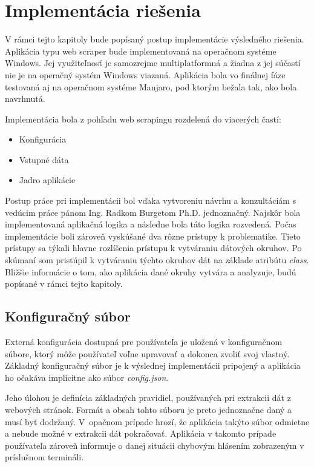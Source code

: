 \chapter{Implementácia riešenia}
\label{implementacia}

V rámci tejto kapitoly bude popísaný postup implementácie výsledného riešenia. Aplikácia typu web scraper bude implementovaná na operačnom systéme Windows. Jej využiteľnosť je samozrejme multiplatformná a žiadna z jej súčastí nie je na operačný systém Windows viazaná. Aplikácia bola vo finálnej fáze testovaná aj na operačnom systéme Manjaro, pod ktorým bežala tak, ako bola navrhnutá.

Implementácia bola z pohľadu web scrapingu rozdelená do viacerých častí:

\begin{itemize}
    \item {Konfigurácia}
    \item {Vstupné dáta}
    \item {Jadro aplikácie}
\end{itemize}

\bigskip

Postup práce pri implementácii bol vďaka vytvoreniu návrhu a konzultáciám s vedúcim práce pánom Ing. Radkom Burgetom Ph.D. jednoznačný. Najskôr bola implementovaná aplikačná logika a následne bola táto logika rozvedená. Počas implementácie boli zároveň vyskúšané dva rôzne prístupy k problematike. Tieto prístupy sa týkali hlavne rozlíšenia prístupu k vytváraniu dátových okruhov. Po skúmaní som pristúpil k vytváraniu týchto okruhov dát na základe atribútu \textit{class}. Bližšie informácie o tom, ako aplikácia dané okruhy vytvára a analyzuje, budú popísané v rámci tejto kapitoly.

\section{Konfiguračný súbor}

Externá konfigurácia dostupná pre používateľa je uložená v konfiguračnom súbore, ktorý môže používateľ voľne upravovať a dokonca zvoliť svoj vlastný. Základný konfiguračný súbor je k výslednej implementácii pripojený a aplikácia ho očakáva implicitne ako súbor \textit{config.json}.

Jeho úlohou je definícia základných pravidiel, používaných pri extrakcii dát z webových stránok. Formát a obsah tohto súboru je preto jednoznačne daný a musí byť dodržaný. V~opačnom prípade hrozí, že aplikácia takýto súbor odmietne a nebude možné v extrakcii dát pokračovať. Aplikácia v takomto prípade používateľa zároveň informuje o danej situácii chybovým hlásením zobrazeným v príslušnom termináli. 
\newpage

